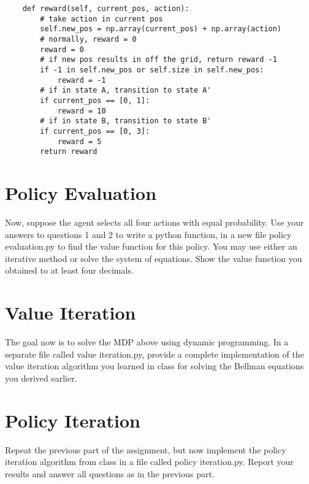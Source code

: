 \documentclass[11pt]{article}
\begin{document}
\lstset{basicstyle=\footnotesize}
\begin{lstlisting}
    def reward(self, current_pos, action):
        # take action in current pos
        self.new_pos = np.array(current_pos) + np.array(action)
        # normally, reward = 0
        reward = 0
        # if new pos results in off the grid, return reward -1
        if -1 in self.new_pos or self.size in self.new_pos:
            reward = -1
        # if in state A, transition to state A'
        if current_pos == [0, 1]:
            reward = 10
        # if in state B, transition to state B'
        if current_pos == [0, 3]:
            reward = 5
        return reward
\end{lstlisting}







\section{Policy Evaluation}
Now, suppose the agent selects all four actions with
equal probability. Use your answers to questions 1 and 2 to write a python function, in
a new file policy evaluation.py to find the value function for this policy. You may use
either an iterative method or solve the system of equations. Show the value function you
obtained to at least four decimals.
\\

\section{Value Iteration}
The goal now is to solve the MDP above using dynamic programming. In a separate file called value iteration.py, provide a complete implementation of the value iteration algorithm you learned in class for solving the Bellman
equations you derived earlier.
\\

\section{Policy Iteration}
Repeat the previous part of the assignment, but now
implement the policy iteration algorithm from class in a file called policy iteration.py.
Report your results and answer all questions as in the previous part.
\\
\end{document}
